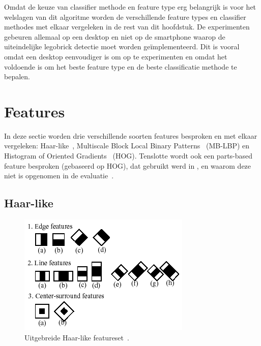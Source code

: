 Omdat de keuze van classifier methode en feature type erg belangrijk is voor het welslagen van dit algoritme worden de verschillende feature types en classifier methodes met elkaar vergeleken in de rest van dit hoofdstuk. De experimenten gebeuren allemaal op een desktop en niet op de smartphone waarop de uiteindelijke legobrick detectie moet worden ge\"implementeerd. Dit is vooral omdat een desktop eenvoudiger is om op te experimenten en omdat het voldoende is om het beste feature type en de beste classificatie methode te bepalen.

\section{Features} \label{sec:feat}

In deze sectie worden drie verschillende soorten features besproken en met elkaar vergeleken: Haar-like~\cite{viola2001rapid}, Multiscale Block Local Binary Patterns~\cite{liao2007learning} (MB-LBP) en Histogram of Oriented Gradients~\cite{dalal2005histograms} (HOG). Tenslotte wordt ook een parts-based feature besproken (gebaseerd op HOG), dat gebruikt werd in \cite{aubry2014seeing}, en waarom deze niet is opgenomen in de evaluatie~\cite{felzenszwalb2010object}.



\subsection{Haar-like} \label{sec:feat_haarlike}

\begin{figure}
  \centering
  \includegraphics[width=.7\linewidth]{img/haar2}
  \caption{Uitgebreide Haar-like featureset~\cite{lienhart2002extended}.}
  \label{fig:haarUitg}
\end{figure}

